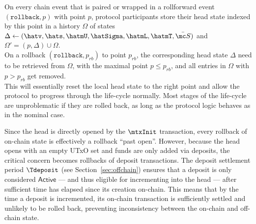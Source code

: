 \quad On every chain event that is paired or
wrapped in a rollforward event $(\mathtt{rollback},p)$ with point $p$, protocol
participants store their head state indexed by this point in a history
$\Omega$ of states $\Delta \gets (\hatv, \hats, \hatmU, \hatSigma, \hatmL, \hatmT, \bar{\mc S})$ and $\Omega' = (p, \Delta) \cup \Omega$. \\

\quad On a rollback
$(\mathtt{rollback},p_{rb})$ to point $p_{rb}$, the corresponding head state
$\Delta$ need to be retrieved from $\Omega$, with the maximal point
$p \leq p_{rb}$, and all entries in $\Omega$ with $p > p_{rb}$ get removed. \\

This will essentially reset the local head state to the right point and allow
the protocol to progress through the life-cycle normally. Most stages of the
life-cycle are unproblematic if they are rolled back, as long as the protocol
logic behaves as in the nominal case.

Since the head is directly opened by the $\mtxInit$ transaction, every rollback
of on-chain state is effectively a rollback ``past open''. However, because the
head opens with an empty UTxO set and funds are only added via deposits, the
critical concern becomes rollbacks of deposit transactions. The deposit
settlement period $\Tdeposit$ (see Section~\ref{sec:offchain}) ensures that a
deposit is only considered $\mathsf{Active}$ --- and thus eligible for
incrementing into the head --- after sufficient time has elapsed since its
creation on-chain. This means that by the time a deposit is incremented, its
on-chain transaction is sufficiently settled and unlikely to be rolled back,
preventing inconsistency between the on-chain and off-chain state.




